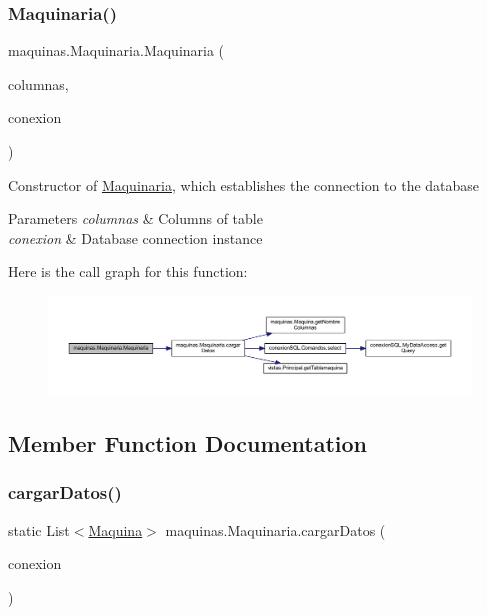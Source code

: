 \subsubsection{\texorpdfstring{Maquinaria()}{Maquinaria()}}
{\footnotesize\ttfamily maquinas.\+Maquinaria.\+Maquinaria (\begin{DoxyParamCaption}\item[{\mbox{\hyperlink{classmaquinas_1_1_modelo_columnas_tabla_maquina}{Modelo\+Columnas\+Tabla\+Maquina}}}]{columnas,  }\item[{\mbox{\hyperlink{classconexion_s_q_l_1_1_my_data_access}{My\+Data\+Access}}}]{conexion }\end{DoxyParamCaption})}

Constructor of \mbox{\hyperlink{classmaquinas_1_1_maquinaria}{Maquinaria}}, which establishes the connection to the database 
\begin{DoxyParams}{Parameters}
{\em columnas} & Columns of table \\
\hline
{\em conexion} & Database connection instance \\
\hline
\end{DoxyParams}
Here is the call graph for this function\+:
\nopagebreak
\begin{figure}[H]
\begin{center}
\leavevmode
\includegraphics[width=350pt]{classmaquinas_1_1_maquinaria_adf1a7cb67d56325ab9689a85945a17bd_cgraph}
\end{center}
\end{figure}


\subsection{Member Function Documentation}
\mbox{\label{classmaquinas_1_1_maquinaria_a8c8ade68894e4e32e50a0130d482bc5e}} 
\subsubsection{\texorpdfstring{cargar\+Datos()}{cargarDatos()}}
{\footnotesize\ttfamily static List$<$\mbox{\hyperlink{classmaquinas_1_1_maquina}{Maquina}}$>$ maquinas.\+Maquinaria.\+cargar\+Datos (\begin{DoxyParamCaption}\item[{\mbox{\hyperlink{classconexion_s_q_l_1_1_my_data_access}{My\+Data\+Access}}}]{conexion }\end{DoxyParamCaption})\hspace{0.3cm}{\ttfamily [static]}}

